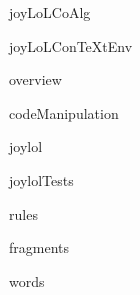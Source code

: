 
\usemodule[t-diSimp]

\startDiSimpComponent joyLoLCoAlg

\usemodule[t-contests]

\diSimpEnvironment joyLoLConTeXtEnv



\diSimpComponent overview

\diSimpComponent codeManipulation

\diSimpComponent joylol

\diSimpComponent joylolTests

\diSimpComponent rules

\diSimpComponent fragments

\diSimpComponent words

\stopDiSimpComponent
